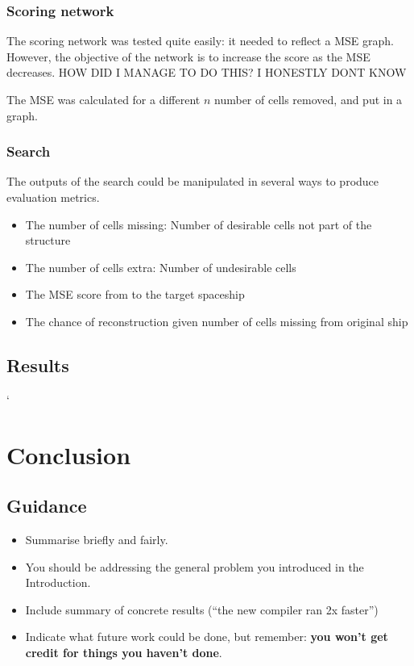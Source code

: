 \documentclass{l4proj}
\begin{document}

\subsection{Scoring network}

The scoring network was tested quite easily: it needed to reflect a MSE graph. However, the objective of the network is to increase the score as the MSE decreases. HOW DID I MANAGE TO DO THIS? I HONESTLY DONT KNOW

The MSE was calculated for a different $n$ number of cells removed, and put in a graph.

\subsection{Search}

The outputs of the search could be manipulated in several ways to produce evaluation metrics. 

\begin{itemize}
    \item The number of cells missing: Number of desirable cells not part of the structure
    \item The number of cells extra: Number of undesirable cells
    \item The MSE score from to the target spaceship
    \item The chance of reconstruction given number of cells missing from original ship
\end{itemize}


\section{Results}
`

\chapter{Conclusion}    


\section{Guidance}
\begin{itemize}
    \item
        Summarise briefly and fairly.
    \item
        You should be addressing the general problem you introduced in the
        Introduction.        
    \item
        Include summary of concrete results (``the new compiler ran 2x
        faster'')
    \item
        Indicate what future work could be done, but remember: \textbf{you
        won't get credit for things you haven't done}.
\end{itemize}
\end{document}
